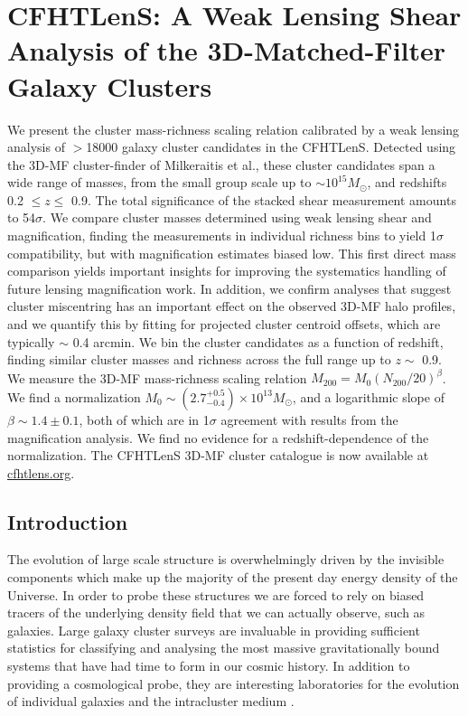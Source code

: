 \chapter{CFHTLenS: A Weak Lensing Shear Analysis of the 3D-Matched-Filter Galaxy Clusters}
\label{ch4}

We present the cluster mass-richness scaling relation calibrated by a weak lensing analysis of $>$18000 galaxy cluster candidates in the \acf{CFHTLenS}. Detected using the \acf{3D-MF} cluster-finder of Milkeraitis et al., these cluster candidates span a wide range of masses, from the small group scale up to $\sim10^{15} M_{\odot}$, and redshifts 0.2 $\leq z\leq$ 0.9. The total significance of the stacked shear measurement amounts to 54$\sigma$. We compare cluster masses determined using weak lensing shear and magnification, finding the measurements in individual richness bins to yield 1$\sigma$ compatibility, but with magnification estimates biased low. This first direct mass comparison yields important insights for improving the systematics handling of future lensing magnification work. In addition, we confirm analyses that suggest cluster miscentring has an important effect on the observed \ac{3D-MF} halo profiles, and we quantify this by fitting for projected cluster centroid offsets, which are typically $\sim$ 0.4 arcmin. We bin the cluster candidates as a function of redshift, finding similar cluster masses and richness across the full range up to $z \sim$ 0.9. We measure the \ac{3D-MF} mass-richness scaling relation $M_{200 } = M_0 (N_{200} / 20)^\beta$. We find a normalization $M_0 \sim (2.7^{+0.5}_{-0.4}) \times 10^{13} M_{\odot}$, and a logarithmic slope of $\beta \sim 1.4 \pm 0.1$, both of which are in 1$\sigma$ agreement with results from the magnification analysis. We find no evidence for a redshift-dependence of the normalization. The \ac{CFHTLenS} \ac{3D-MF} cluster catalogue is now available at \url{cfhtlens.org}.



\section{Introduction}
\label{intro}
The evolution of large scale structure is overwhelmingly driven by the invisible components which make up the majority of the present day energy density of the Universe. In order to probe these structures we are forced to rely on biased tracers of the underlying density field that we can actually observe, such as galaxies. Large galaxy cluster surveys are invaluable in providing sufficient statistics for classifying and analysing the most massive gravitationally bound systems that have had time to form in our cosmic history. In addition to providing a cosmological probe, they are interesting laboratories for the evolution of individual galaxies and the intracluster medium \citep{Voit05}.

